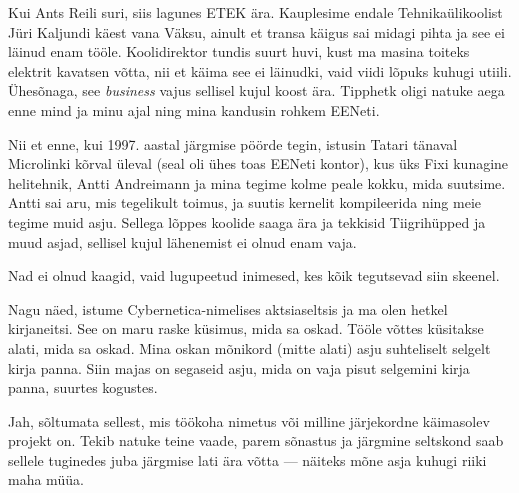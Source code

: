Kui Ants Reili suri, siis lagunes ETEK ära. 
Kauplesime endale Tehnikaülikoolist Jüri 
Kaljundi käest vana Väksu, ainult et 
transa käigus sai midagi pihta ja see ei läinud enam tööle. Koolidirektor tundis suurt
huvi, kust ma masina toiteks elektrit kavatsen võtta, nii et käima see 
ei läinudki, vaid viidi lõpuks kuhugi utiili. Ühesõnaga, see \emph{business} vajus 
sellisel kujul koost ära. Tipphetk oligi natuke aega enne mind ja minu 
ajal ning mina kandusin rohkem EENeti. 

Nii et enne, kui 1997. aastal järgmise pöörde tegin, istusin 
Tatari tänaval Microlinki kõrval üleval (seal oli ühes toas EENeti kontor), kus 
üks Fixi kunagine helitehnik, Antti Andreimann ja mina tegime kolme peale kokku, mida suutsime. Antti 
sai aru, mis tegelikult toimus, ja suutis kernelit kompileerida ning meie tegime 
muid asju. Sellega lõppes koolide saaga ära ja tekkisid 
Tiigrihüpped ja muud asjad, sellisel kujul lähenemist ei 
olnud enam vaja. 


Nad ei olnud kaagid, vaid lugupeetud inimesed, kes kõik tegutsevad siin skeenel. 


Nagu näed, istume Cybernetica-nimelises aktsiaseltsis ja 
ma olen hetkel kirjaneitsi. See on maru raske küsimus, mida sa oskad. 
Tööle võttes küsitakse alati, mida sa oskad. Mina oskan mõnikord (mitte 
alati) asju suhteliselt selgelt kirja panna. Siin 
majas on segaseid asju, mida on vaja pisut selgemini kirja panna, suurtes 
kogustes. 


Jah, sõltumata sellest, mis töökoha nimetus või milline järjekordne 
käimasolev projekt on. Tekib natuke teine vaade, 
parem sõnastus ja järgmine seltskond saab sellele tuginedes juba järgmise 
lati ära võtta --- näiteks mõne asja kuhugi riiki maha müüa. 